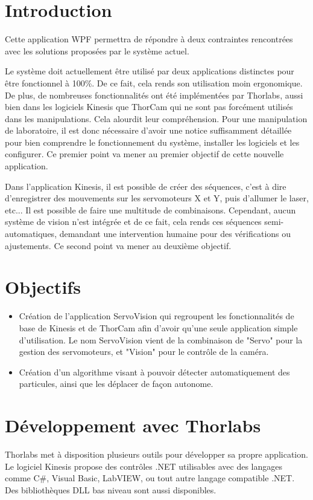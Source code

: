 \section{Introduction}
Cette application WPF permettra de répondre à deux contraintes rencontrées avec les solutions proposées par le système actuel.

Le système doit actuellement être utilisé par deux applications distinctes pour être fonctionnel à 100\%. De ce fait, cela rends son utilisation moin ergonomique. De plus, de nombreuses fonctionnalités ont été implémentées par Thorlabs, aussi bien dans les logiciels Kinesis que ThorCam qui ne sont pas forcément utilisés dans les manipulations. Cela alourdit leur compréhension. Pour une manipulation de laboratoire, il est donc nécessaire d'avoir une notice suffisamment détaillée pour bien comprendre le fonctionnement du système, installer les logiciels et les configurer. Ce premier point va mener au premier objectif de cette nouvelle application.

Dans l'application Kinesis, il est possible de créer des séquences, c'est à dire d'enregistrer des mouvements sur les servomoteurs X et Y, puis d'allumer le laser, etc... Il est possible de faire une multitude de combinaisons. Cependant, aucun système de vision n'est intégrée et de ce fait, cela rends ces séquences semi-automatiques, demandant une intervention humaine pour des vérifications ou ajustements. Ce second point va mener au deuxième objectif.

\section{Objectifs}
\begin{itemize}[label=\textbullet]
    \item Création de l'application ServoVision qui regroupent les fonctionnalités de base de Kinesis et de ThorCam afin d'avoir qu'une seule application simple d'utilisation. Le nom ServoVision vient de la combinaison de "Servo" pour la gestion des servomoteurs, et "Vision" pour le contrôle de la caméra.
    \item Création d'un algorithme visant à pouvoir détecter automatiquement des particules, ainsi que les déplacer de façon autonome.
\end{itemize}

\newpage
\section{Développement avec Thorlabs}
Thorlabs met à disposition plusieurs outils pour développer sa propre application. Le logiciel Kinesis propose des contrôles .NET utilisables avec des langages comme C\#, Visual Basic, LabVIEW, ou tout autre langage compatible .NET. Des bibliothèques DLL bas niveau sont aussi disponibles.


